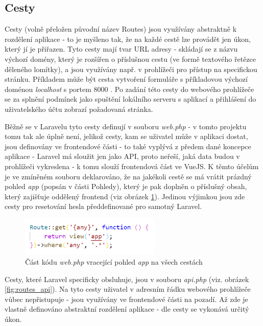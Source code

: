 	\subsection{Cesty}\label{sec:routes} %
	Cesty (volně přeložen původní název Routes) jsou využívány abstraktně k rozdělení aplikace - to je myšleno tak, že na každé cestě lze provádět jen úkon, který jí je přiřazen. Tyto cesty mají tvar URL adresy - skládají se z názvu výchozí domény, který je rozšířen o příslušnou cestu (ve formě textového řetězce děleného lomítky), a jsou využívány např. v prohlížeči pro přístup na specifickou stránku. Příkladem může být cesta vytvoření formuláře s příkladovou výchozí doménou \textit{localhost} s portem 8000 \textit{}. Po zadání této cesty do webového prohlížeče se za splnění podmínek jako spuštění lokálního serveru s aplikací a přihlášení do uživatelského účtu zobrazí požadovaná stránka.
	
	Běžně se v Laravelu tyto cesty definují v souboru \textit{web.php} - v tomto projektu tomu tak ale úplně není, jelikož cesty, kam se uživatel může v aplikaci dostat, jsou definovány ve frontendové části - to také vyplývá z předem dané koncepce aplikace - Laravel má sloužit jen jako API, proto neřeší, jaká data budou v prohlížeči vykreslena - k tomu slouží frontendová část ve VueJS. K těmto účelům je ve zmíněném souboru deklarováno, že na jakékoli cestě se má vrátit prázdný pohled \textit{app} (popsán v části Pohledy), který je pak doplněn o příslušný obsah, který zajišťuje oddělený frontend (viz obrázek \ref{fig:routes_web}). Jedinou výjimkou jsou zde cesty pro resetování hesla předdefinované pro samotný Laravel.
	
	\begin{figure}[H]
		\centering %
		\includegraphics[width=0.6\textwidth]{img/routes/web_routes.png} %
		\caption{Část kódu \textit{web.php} vracející pohled \textit{app} na všech cestách} %
		\label{fig:routes_web} %
	\end{figure}
	
	Cesty, které Laravel specificky obsluhuje, jsou v souboru \textit{api.php} (viz. obrázek \ref{fig:routes_api}). Na tyto cesty uživatel v adresním řádku webového prohlížeče vůbec nepřistupuje - jsou využívány ve frontendové části na pozadí. Až zde je vlastně definováno abstraktní rozdělení aplikace - dle cesty se vykonává určitý úkon. 
	
